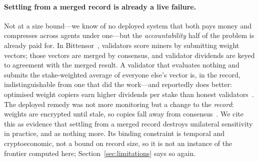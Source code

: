 \paragraph{Settling from a merged record is already a live failure.}
Not at a size bound---we know of no deployed system that both pays money and
compresses across agents under one---but the \emph{accountability} half of the
problem is already paid for. In Bittensor~\cite{bittensorweightcopier},
validators score miners by submitting weight vectors; those vectors are merged by
consensus, and validator dividends are keyed to agreement with the merged result.
A validator that evaluates nothing and submits the stake-weighted average of
everyone else's vector is, in the record, indistinguishable from one that did the
work---and reportedly does better: optimised weight copiers earn higher dividends
per stake than honest validators~\cite{bittensorfreeriding}. The deployed remedy
was not more monitoring but a change to the \emph{record}: weights are encrypted
until stale, so copies fall away from consensus~\cite{bittensorcommitreveal}.
We cite this as evidence that settling from a merged record destroys unilateral
sensitivity in practice, and as nothing more. Its binding constraint is temporal
and cryptoeconomic, not a bound on record size, so it is not an instance of the
frontier computed here; Section~\ref{sec:limitations} says so again.

